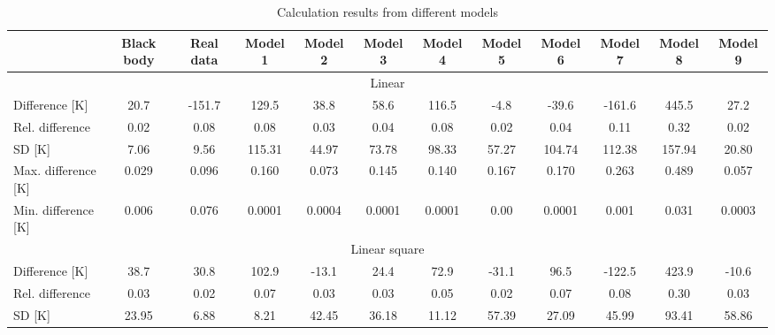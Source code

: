 \begin{table}
    \centering
    \caption{Calculation results from different models}
    \label{tab: statistic_results}
    \begin{tabular}{lccccccccccc}
        \hline
        & \multicolumn{1}{c}{Black body} & \multicolumn{1}{c}{Real data} & Model 1 & Model 2 & Model 3 & Model 4 & Model 5 & Model 6 & Model 7 & Model 8 & Model 9 \\ \hline
        \multicolumn{12}{c}{Linear}                                                                                                                                                         \\ \hline
        Difference {[}K{]}      & 20.7                           & -151.7                        & 129.5   & 38.8    & 58.6    & 116.5   & -4.8    & -39.6   & -161.6  & 445.5   & 27.2     \\
        Rel. difference         & 0.02                           & 0.08                          & 0.08    & 0.03    & 0.04    & 0.08    & 0.02    & 0.04    & 0.11    & 0.32    & 0.02     \\
        SD {[}K{]}              & 7.06                           & 9.56                          & 115.31  & 44.97   & 73.78   & 98.33   & 57.27   & 104.74  & 112.38  & 157.94  & 20.80    \\
        Max. difference {[}K{]} & 0.029                          & 0.096                         & 0.160   & 0.073   & 0.145   & 0.140   & 0.167   & 0.170   & 0.263   & 0.489   & 0.057    \\
        Min. difference {[}K{]} & 0.006                          & 0.076                         & 0.0001  & 0.0004  & 0.0001  & 0.0001  & 0.00    & 0.0001  & 0.001   & 0.031   & 0.0003   \\ \hline
        \multicolumn{12}{c}{Linear square}                                                                                                                                                   \\ \hline
        Difference {[}K{]}      & 38.7                           & 30.8                          & 102.9   & -13.1   & 24.4    & 72.9    & -31.1   & 96.5    & -122.5  & 423.9   & -10.6   \\
        Rel. difference         & 0.03                           & 0.02                          & 0.07    & 0.03    & 0.03    & 0.05    & 0.02    & 0.07    & 0.08    & 0.30    & 0.03    \\
        SD {[}K{]}              & 23.95                          & 6.88                          & 8.21    & 42.45   & 36.18   & 11.12   & 57.39   & 27.09   & 45.99   & 93.41   & 58.86   \\

\end{tabular}
\end{table}
